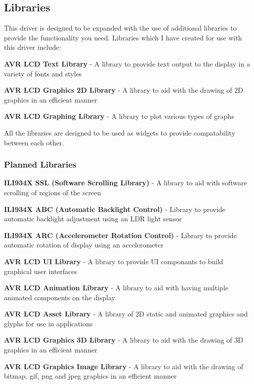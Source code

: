 \subsection*{Libraries }

This driver is designed to be expanded with the use of additional libraries to provide the functionality you need. Libraries which I have created for use with this driver include\+:


\begin{DoxyItemize}
\item {\bfseries A\+V\+R L\+C\+D Text Library} -\/ A library to provide text output to the display in a variety of fonts and styles
\item {\bfseries A\+V\+R L\+C\+D Graphics 2\+D Library} -\/ A library to aid with the drawing of 2\+D graphics in an efficient manner
\item {\bfseries A\+V\+R L\+C\+D Graphing Library} -\/ A library to plot various types of graphs
\end{DoxyItemize}

All the libraries are designed to be used as widgets to provide compatability between each other.

\subsubsection*{Planned Libraries}


\begin{DoxyItemize}
\item {\bfseries I\+L\+I934\+X S\+S\+L (Software Scrolling Library)} -\/ A library to aid with software scrolling of regions of the screen
\item {\bfseries I\+L\+I934\+X A\+B\+C (Automatic Backlight Control)} -\/ Library to provide automatic backlight adjustment using an L\+D\+R light sensor
\item {\bfseries I\+L\+I934\+X A\+R\+C (Accelerometer Rotation Control)} -\/ Library to provide automatic rotation of display using an accelerometer
\item {\bfseries A\+V\+R L\+C\+D U\+I Library} -\/ A library to provide U\+I componants to build graphical user interfaces
\item {\bfseries A\+V\+R L\+C\+D Animation Library} -\/ A library to aid with having multiple animated components on the display
\item {\bfseries A\+V\+R L\+C\+D Asset Library} -\/ A library of 2\+D static and animated graphics and glyphs for use in applications
\item {\bfseries A\+V\+R L\+C\+D Graphics 3\+D Library} -\/ A library to aid with the drawing of 3\+D graphics in an efficient manner
\item {\bfseries A\+V\+R L\+C\+D Graphics Image Library} -\/ A library to aid with the drawing of bitmap, gif, png and jpeg graphics in an efficient manner
\end{DoxyItemize}

